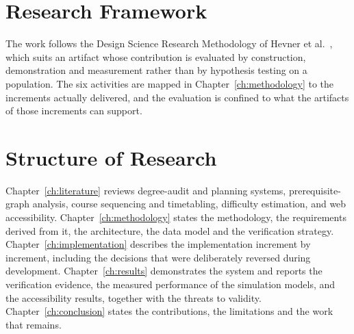 \section{Research Framework}

The work follows the Design Science Research Methodology of Hevner et al.\ \cite{hevner2004},
which suits an artifact whose contribution is evaluated by construction, demonstration and
measurement rather than by hypothesis testing on a population. The six activities are mapped in
Chapter~\ref{ch:methodology} to the increments actually delivered, and the evaluation is confined
to what the artifacts of those increments can support.

\section{Structure of Research}

Chapter~\ref{ch:literature} reviews degree-audit and planning systems, prerequisite-graph
analysis, course sequencing and timetabling, difficulty estimation, and web accessibility.
Chapter~\ref{ch:methodology} states the methodology, the requirements derived from it, the
architecture, the data model and the verification strategy.
Chapter~\ref{ch:implementation} describes the implementation increment by increment, including the
decisions that were deliberately reversed during development.
Chapter~\ref{ch:results} demonstrates the system and reports the verification evidence, the
measured performance of the simulation models, and the accessibility results, together with the
threats to validity.
Chapter~\ref{ch:conclusion} states the contributions, the limitations and the work that remains.

